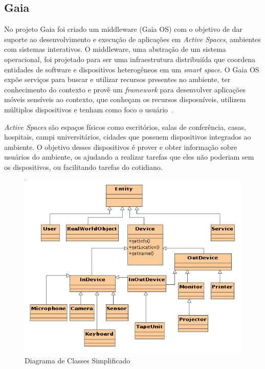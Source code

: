 \subsection{Gaia}
No projeto Gaia foi criado um middleware (Gaia OS) com o objetivo de dar suporte ao desenvolvimento e execução de aplicações em \emph{Active Spaces}, ambientes com sistemas interativos. O middleware, uma abstração de um sistema operacional, foi projetado para ser uma infraestrutura distribuiída que coordena entidades de software e dispositivos heterogêneos em um \emph{smart space}. O Gaia OS expõe serviços para buscar e utilizar recursos presentes no ambiente, ter conhecimento do contexto e provê um \emph{framework} para desenvolver aplicações móveis sensíveis ao contexto, que conheçam os recursos disposníveis, utilizem múltiplos dispositivos e tenham como foco o usuário~\cite{gaia2002}.

\emph{Active Spaces} são espaços físicos como escritórios, salas de conferência, casas, hospitais, campi universitários, cidades que possuem dispositivos integrados ao ambiente. O objetivo desses dispositivos é prover e obter informação sobre usuários do ambiente, os ajudando a realizar tarefas que eles não poderiam sem os dispositivos, ou facilitando tarefas do cotidiano.

\begin{figure}[ht]
\center
\includegraphics[scale=0.5]{imagens/gaia-devices}
\caption{Diagrama de Classes Simplificado~\cite{gaiaDevices}}
\label{fig:gaiaClassDiagram}
\end{figure}

